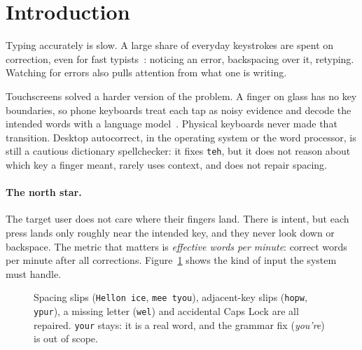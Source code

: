 \documentclass[11pt,a4paper]{article}
\newcommand{\qk}{QuipKeys}
\newcommand{\ttw}[1]{\texttt{#1}}
\begin{document}
\section{Introduction}

Typing accurately is slow. A large share of everyday keystrokes are spent on correction, even for fast typists~\citep{dhakal2018}: noticing an error, backspacing over it, retyping. Watching for errors also pulls attention from what one is writing.

Touchscreens solved a harder version of the problem. A finger on glass has no key boundaries, so phone keyboards treat each tap as noisy evidence and decode the intended words with a language model~\citep{goodman2002,kristensson2004,vertanen2015}. Physical keyboards never made that transition. Desktop autocorrect, in the operating system or the word processor, is still a cautious dictionary spellchecker: it fixes \ttw{teh}, but it does not reason about which key a finger meant, rarely uses context, and does not repair spacing.

\paragraph{The north star.} The target user does not care where their fingers land. There is intent, but each press lands only roughly near the intended key, and they never look down or backspace. The metric that matters is \emph{effective words per minute}: correct words per minute after all corrections. Figure~\ref{fig:example} shows the kind of input the system must handle.

\begin{figure}[h]
\centering
{}
\caption{Spacing slips (\ttw{Hellon ice}, \ttw{mee tyou}), adjacent-key slips (\ttw{hopw}, \ttw{ypur}), a missing letter (\ttw{wel}) and accidental Caps Lock are all repaired. \ttw{your} stays: it is a real word, and the grammar fix (\emph{you're}) is out of scope.}
\label{fig:example}
\end{figure}
\end{document}
